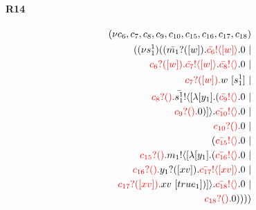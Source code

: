 \documentclass{article}
\begin{document}
\paragraph{R14}
\begin{align*}
 (\nu c_{6},c_{7},c_{8},c_{9},c_{10},c_{15},c_{16},c_{17},c_{18}) \\ ( (\nu s^{1}_{1})((\color{black}\bar{m_{1}}?([w]).\color{black}\color{red}\bar{c_{6}}! \langle [w] \rangle \color{black}.0  \ | \\ \color{red}c_{6}?([w]).\color{black}\color{red}\bar{c_{7}}! \langle [w] \rangle \color{black}.\color{red}\bar{c_{8}}! \langle  \rangle \color{black}.0  \ | \\ \color{red}c_{7}?([w]).\color{black}w \ [s^{1}_{1}] \ | \\ \color{red}c_{8}?().\color{black}\color{black}\bar{s^{1}_{1}}! \langle [ \lambda [y_{1}].(\color{red}\bar{c_{9}}! \langle  \rangle \color{black}.0  \ | \\ \color{red}c_{9}?().\color{black}0 )] \rangle \color{black}.\color{red}\bar{c_{10}}! \langle  \rangle \color{black}.0  \ | \\ \color{red}c_{10}?().\color{black}0  \ | \\ (\color{red}\bar{c_{15}}! \langle  \rangle \color{black}.0  \ | \\ \color{red}c_{15}?().\color{black}\color{black}m_{1}! \langle [ \lambda [y_{1}].(\color{red}\bar{c_{16}}! \langle  \rangle \color{black}.0  \ | \\ \color{red}c_{16}?().\color{black}\color{black}y_{1}?([xv]).\color{black}\color{red}\bar{c_{17}}! \langle [xv] \rangle \color{black}.0  \ | \\ \color{red}c_{17}?([xv]).\color{black}xv \ [true_{1}])] \rangle \color{black}.\color{red}\bar{c_{18}}! \langle  \rangle \color{black}.0  \ | \\ \color{red}c_{18}?().\color{black}0 ))))
\end{align*}
\end{document}

